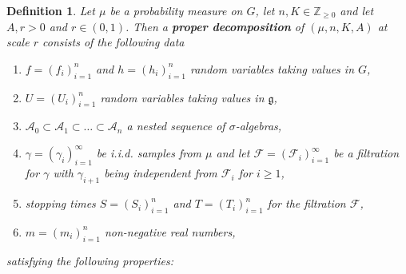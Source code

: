 \documentclass[10pt, english,oneside,reqno]{amsart}
\theoremstyle{plain}
\newtheorem{definition}[theorem]{Definition}
\theoremstyle{remark}
\numberwithin{equation}{section}
\numberwithin{figure}{section}
\newcommand{\Z}{\mathbb{Z}}
\begin{document}
\begin{definition}\label{ProperDecomp}
    Let $\mu$ be a probability measure on $G$, let $n,K \in \Z_{\geq 0}$ and let $A, r > 0$ and $r \in (0,1)$. Then a \textbf{proper decomposition} of $(\mu,n,K,A)$ at scale $r$ consists of the following data
    \begin{enumerate}[label = (\roman*)]
        \item $f = (f_i)_{i = 1}^n$ and $h = (h_i)_{i = 1}^n$ random variables taking values in $G$,
        \item $U = (U_i)_{i = 1}^n$ random variables taking values in $\mathfrak{g}$,
        \item $\mathscr{A}_0 \subset \mathscr{A}_1 \subset \ldots \subset \mathscr{A}_n$ a nested sequence of $\sigma$-algebras,
        \item $\gamma = (\gamma_i)_{i = 1}^{\infty}$ be i.i.d. samples from $\mu$ and let $\mathscr{F} = (\mathscr{F}_i)_{i = 1}^{\infty}$ be a filtration for $\gamma$ with $\gamma_{i + 1}$ being independent from $\mathscr{F}_i$ for $i \geq 1$,
        \item stopping times $S = (S_i)_{i = 1}^n$ and $T = (T_i)_{i = 1}^n$ for the filtration $\mathscr{F}$,
        \item $m = (m_i)_{i = 1}^n$ non-negative real numbers,
    \end{enumerate}

    satisfying the following properties:
        

\end{definition}
\end{document}
